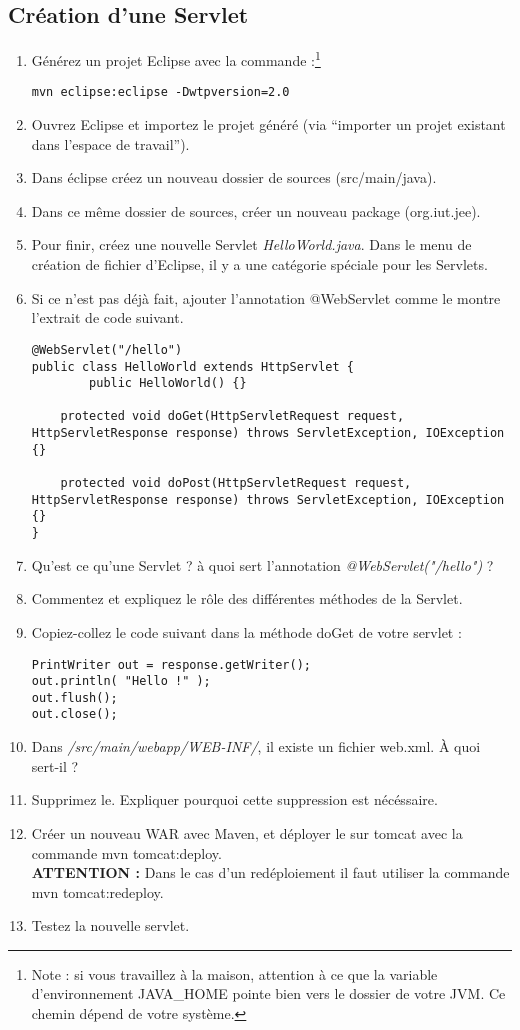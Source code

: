 \documentclass[a4,12pt]{article}
\begin{document}
\subsection{Création d'une Servlet}
\begin{enumerate}
	\item Générez un projet Eclipse avec la commande :\footnote{Note : si vous travaillez à la maison, attention à ce que la variable d'environnement JAVA\_HOME pointe bien vers le dossier de votre JVM. Ce chemin dépend de votre système.}
	\begin{lstlisting}
mvn eclipse:eclipse -Dwtpversion=2.0
	 \end{lstlisting}
	\item Ouvrez Eclipse et importez le projet généré (via ``importer un projet existant dans l'espace de travail'').
	\item Dans éclipse créez un nouveau dossier de sources (src/main/java).
	\item Dans ce même dossier de sources, créer un nouveau package (org.iut.jee).
	\item Pour finir, créez une nouvelle Servlet \emph{HelloWorld.java}. Dans le
          menu de création de fichier d'Eclipse, il y a une catégorie
          spéciale pour les Servlets.
          \item Si ce n'est pas déjà fait, ajouter l'annotation @WebServlet comme le montre l'extrait de code suivant.
\begin{lstlisting}
@WebServlet("/hello")
public class HelloWorld extends HttpServlet {
    	public HelloWorld() {}
    
	protected void doGet(HttpServletRequest request, HttpServletResponse response) throws ServletException, IOException {}

	protected void doPost(HttpServletRequest request, HttpServletResponse response) throws ServletException, IOException {}
}
\end{lstlisting}
	\item Qu'est ce qu'une Servlet ? à quoi sert l'annotation \emph{@WebServlet("/hello")} ?
	\item Commentez et expliquez le rôle des différentes méthodes de la Servlet.
	\item Copiez-collez le code suivant dans la méthode doGet de votre servlet :
\begin{lstlisting}
PrintWriter out = response.getWriter();
out.println( "Hello !" );
out.flush();
out.close();
\end{lstlisting}
	\item Dans \emph{/src/main/webapp/WEB-INF/}, il existe un fichier web.xml. À quoi sert-il ? 
	\item Supprimez le. Expliquer pourquoi cette suppression est nécéssaire. 
	\item Créer un nouveau WAR avec Maven, et déployer le sur tomcat avec la commande mvn tomcat:deploy. \\ \textbf{ATTENTION :} Dans le cas d'un redéploiement il faut utiliser la commande mvn tomcat:redeploy. 
	\item Testez la nouvelle servlet.
\end{enumerate}
\end{document}
